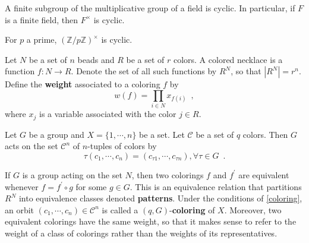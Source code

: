 \begin{proposition}
	\cite[314]{DummitFoote2004}
	A finite subgroup of the multiplicative group of a field is cyclic. In particular,
	if $F$ is a finite field, then $F^\times$ is cyclic.
\end{proposition}

\begin{corollary}
	\cite[314]{DummitFoote2004}
	For $p$ a prime, $(\mathbb{Z} / p \mathbb{Z})^\times$ is cyclic.
\end{corollary}

\begin{definition}
	\cite[85]{Aigner2007}
	Let $N$ be a set of $n$ beads and $R$ be a set of $r$ colors. A colored necklace is
	a function $f : N \to R$. Denote the set of all such functions by $R^N$, so that
	$|R^N| = r^n$. Define the \textbf{weight} associated to a coloring $f$ by
	\begin{equation}
		w(f) = \prod_{i \in N} x_{f(i)} \enspace,
	\end{equation}
	where $x_j$ is a variable associated with the color $j \in R$.
\end{definition}

\begin{proposition}
	\label{coloring}
	\cite[110]{Rotman1967}
	Let $G$ be a group and $X = \{ 1, \cdots, n \}$ be a set. Let $\mathcal{C}$ be a set
	of $q$ colors. Then $G$ acts on the set $\mathcal{C}^n$ of $n$-tuples of colors by
	\begin{equation}
		\tau(c_1, \cdots, c_n) = (c_{\tau 1}, \cdots, c_{\tau n}),
		\forall \tau \in G \enspace.
	\end{equation}
\end{proposition}

\begin{proposition}
	\cite[85]{Aigner2007}
	\cite[110]{Rotman1967}
	If $G$ is a group acting on the set $N$, then two colorings $f$ and $f^\prime$
	are equivalent whenever $f = f^\prime \circ g$ for some $g \in G$. This is an
	equivalence relation that partitions $R^N$ into equivalence classes denoted
	\textbf{patterns}. Under the conditions of \ref{coloring}, an orbit
	$(c_1, \cdots, c_n) \in \mathcal{C}^n$ is called a $(q, G)$-\textbf{coloring} of $X$.
	Moreover, two equivalent colorings have the same weight, so that it makes sense to refer to
	the weight of a class of colorings rather than the weights of its representatives.
\end{proposition}

